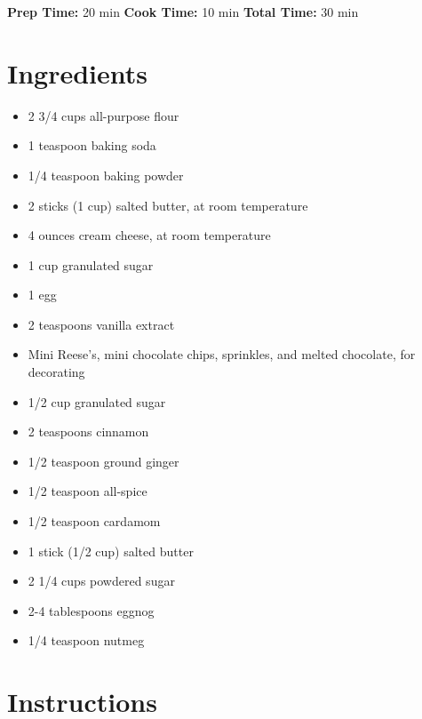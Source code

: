 \documentclass[
  letterpaper,
  DIV=11,
  numbers=noendperiod,
  titlepage=false]{scrreprt}
\providecommand{\tightlist}{%
  \setlength{\itemsep}{0pt}\setlength{\parskip}{0pt}}\usepackage{longtable,booktabs,array}
\begin{document}
\textbf{Prep Time:} 20 min \textbar{} \textbf{Cook Time:} 10 min
\textbar{} \textbf{Total Time:} 30 min

\section{Ingredients}\label{ingredients-36}

\begin{itemize}
\tightlist
\item
  2 3/4 cups all-purpose flour
\item
  1 teaspoon baking soda
\item
  1/4 teaspoon baking powder
\item
  2 sticks (1 cup) salted butter, at room temperature
\item
  4 ounces cream cheese, at room temperature
\item
  1 cup granulated sugar
\item
  1 egg
\item
  2 teaspoons vanilla extract
\item
  Mini Reese's, mini chocolate chips, sprinkles, and melted chocolate,
  for decorating
\item
  1/2 cup granulated sugar
\item
  2 teaspoons cinnamon
\item
  1/2 teaspoon ground ginger
\item
  1/2 teaspoon all-spice
\item
  1/2 teaspoon cardamom
\item
  1 stick (1/2 cup) salted butter
\item
  2 1/4 cups powdered sugar
\item
  2-4 tablespoons eggnog
\item
  1/4 teaspoon nutmeg
\end{itemize}

\section{Instructions}\label{instructions-36}
\end{document}

